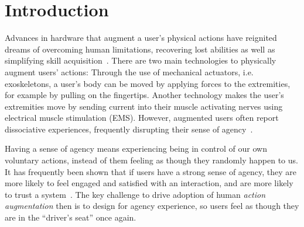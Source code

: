\section{Introduction}
Advances in hardware that augment a user's physical actions have reignited dreams of overcoming human limitations, recovering lost abilities as well as simplifying skill acquisition~\citep{Kasahara2019-sk, Goto2020-mw}. There are two main technologies to physically augment users' actions: Through the use of mechanical actuators, i.e. exoskeletons, a user's body can be moved by applying forces to the extremities, for example by pulling on the fingertips. Another technology makes the user's extremities move by sending current into their muscle activating nerves using electrical muscle stimulation (EMS). However, augmented users often report dissociative experiences, frequently disrupting their sense of agency~\citep{Gilbert2017-ze, Gilbert2019-uc}.

Having a sense of agency means experiencing being in control of our own voluntary actions, instead of them feeling as though they randomly happen to us. It has frequently been shown that if users have a strong sense of agency, they are more likely to feel engaged and satisfied with an interaction, and are more likely to trust a system~\citep{Berberian2012-do, Miller2007-rb}. The key challenge to drive adoption of human \textit{action augmentation} then is to design for agency experience, so users feel as though they are in the ``driver's seat'' once again.

